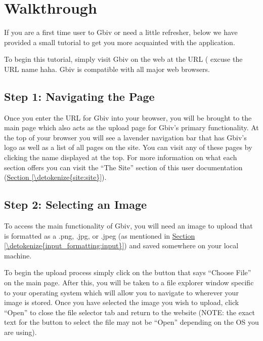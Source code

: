 \documentclass[letterpaper,10pt,english,openany,oneside]{sphinxmanual}
\begin{document}
\chapter{Walkthrough}
\label{\detokenize{walkthrough:walkthrough}}\label{\detokenize{walkthrough:id1}}\label{\detokenize{walkthrough::doc}}
\sphinxAtStartPar
If you are a first time user to Gbiv or need a little refresher, below we have provided a small tutorial to get you more acquainted with the application.

\sphinxAtStartPar
To begin this tutorial, simply visit Gbiv on the web at the URL ( excuse the URL name haha. Gbiv is compatible with all major web browsers.


\section{Step 1: Navigating the Page}
\label{\detokenize{walkthrough:step-1-navigating-the-page}}
\sphinxAtStartPar
Once you enter the URL for Gbiv into your browser, you will be brought to the main page which also acts as the upload page for Gbiv’s primary functionality. At the top of your browser you will see a lavender navigation bar that has Gbiv’s logo as well as a list of all pages on the site. You can visit any of these pages by clicking the name displayed at the top. For more information on what each section offers you can visit the “The Site” section of this user documentation (\hyperref[\detokenize{site:site}]{Section \ref{\detokenize{site:site}}}).


\section{Step 2: Selecting an Image}
\label{\detokenize{walkthrough:step-2-selecting-an-image}}
\sphinxAtStartPar
To access the main functionality of Gbiv, you will need an image to upload that is formatted as a .png, .jpg, or .jpeg (as mentioned in \hyperref[\detokenize{input_formatting:input}]{Section \ref{\detokenize{input_formatting:input}}}) and saved somewhere on your local machine.

\sphinxAtStartPar
To begin the upload process simply click on the button that says “Choose File” on the main page. After this, you will be taken to a file explorer window specific to your operating system which will allow you to navigate to wherever your image is stored. Once you have selected the image you wish to upload, click “Open” to close the file selector tab and return to the website (NOTE: the exact text for the button to select the file may not be “Open” depending on the OS you are using).
\end{document}
